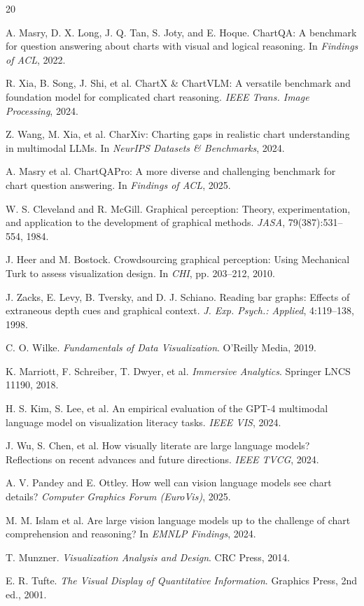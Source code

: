 \documentclass[sigconf, 10pt]{acmart}
\begin{document}

\begin{thebibliography}{20}

A. Masry, D. X. Long, J. Q. Tan, S. Joty, and E. Hoque. ChartQA: A benchmark for question answering about charts with visual and logical reasoning. In \textit{Findings of ACL}, 2022.

R. Xia, B. Song, J. Shi, et al. ChartX \& ChartVLM: A versatile benchmark and foundation model for complicated chart reasoning. \textit{IEEE Trans. Image Processing}, 2024.

Z. Wang, M. Xia, et al. CharXiv: Charting gaps in realistic chart understanding in multimodal LLMs. In \textit{NeurIPS Datasets \& Benchmarks}, 2024.

A. Masry et al. ChartQAPro: A more diverse and challenging benchmark for chart question answering. In \textit{Findings of ACL}, 2025.

W. S. Cleveland and R. McGill. Graphical perception: Theory, experimentation, and application to the development of graphical methods. \textit{JASA}, 79(387):531--554, 1984.

J. Heer and M. Bostock. Crowdsourcing graphical perception: Using Mechanical Turk to assess visualization design. In \textit{CHI}, pp. 203--212, 2010.

J. Zacks, E. Levy, B. Tversky, and D. J. Schiano. Reading bar graphs: Effects of extraneous depth cues and graphical context. \textit{J. Exp. Psych.: Applied}, 4:119--138, 1998.

C. O. Wilke. \textit{Fundamentals of Data Visualization}. O'Reilly Media, 2019.

K. Marriott, F. Schreiber, T. Dwyer, et al. \textit{Immersive Analytics}. Springer LNCS 11190, 2018.

H. S. Kim, S. Lee, et al. An empirical evaluation of the GPT-4 multimodal language model on visualization literacy tasks. \textit{IEEE VIS}, 2024.

J. Wu, S. Chen, et al. How visually literate are large language models? Reflections on recent advances and future directions. \textit{IEEE TVCG}, 2024.

A. V. Pandey and E. Ottley. How well can vision language models see chart details? \textit{Computer Graphics Forum (EuroVis)}, 2025.

M. M. Islam et al. Are large vision language models up to the challenge of chart comprehension and reasoning? In \textit{EMNLP Findings}, 2024.

T. Munzner. \textit{Visualization Analysis and Design}. CRC Press, 2014.

E. R. Tufte. \textit{The Visual Display of Quantitative Information}. Graphics Press, 2nd ed., 2001.

\end{thebibliography}
\end{document}

